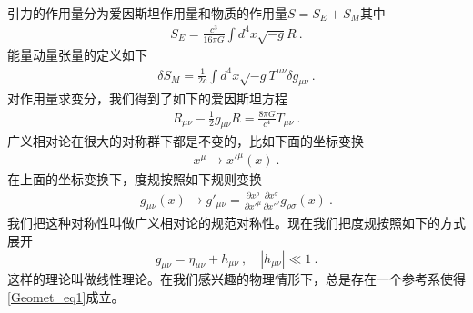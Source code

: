 引力的作用量分为爱因斯坦作用量和物质的作用量$S=S_E+S_M$其中
\begin{align}
S_E = \frac{c^3}{16\pi G} \int d^4 x \sqrt{-g} R~.
\end{align}
能量动量张量的定义如下
\begin{align}
\delta S_M = \frac{1}{2 c} \int d^4 x \sqrt{-g} T^{\mu\nu} \delta g_{\mu\nu} ~. 
\end{align}
对作用量求变分，我们得到了如下的爱因斯坦方程
\begin{align}
R_{\mu\nu} - \frac{1}{2} g_{\mu\nu} R = \frac{8\pi G}{c^4} T_{\mu\nu} ~. 
\end{align}
广义相对论在很大的对称群下都是不变的，比如下面的坐标变换
\begin{align}
x^\mu \rightarrow x'^\mu (x) ~. 
\end{align}
在上面的坐标变换下，度规按照如下规则变换
\begin{align}
g_{\mu\nu} (x) \rightarrow g'_{\mu\nu}  = \frac{\partial x^\rho}{\partial x'^\mu} \frac{\partial x^\sigma}{\partial x'^\nu} g_{\rho\sigma} (x) ~. 
\end{align}
我们把这种对称性叫做广义相对论的规范对称性。现在我们把度规按照如下的方式展开
\begin{equation}\label{Geomet_eq1}
g_{\mu\nu} = \eta_{\mu\nu} + h_{\mu\nu}~, \quad |h_{\mu\nu}| \ll 1 ~. 
\end{equation} 
这样的理论叫做线性理论。在我们感兴趣的物理情形下，总是存在一个参考系使得\autoref{Geomet_eq1}成立。





